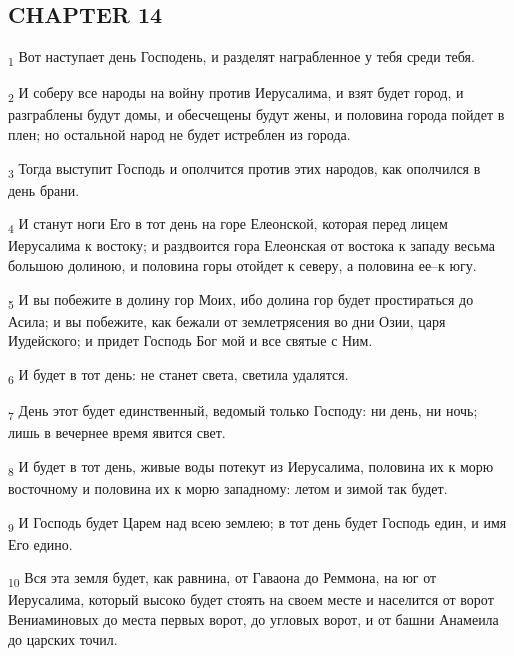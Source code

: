 \subsection{CHAPTER 14}
\begin{tcolorbox}
\textsubscript{1} Вот наступает день Господень, и разделят награбленное у тебя среди тебя.
\end{tcolorbox}
\begin{tcolorbox}
\textsubscript{2} И соберу все народы на войну против Иерусалима, и взят будет город, и разграблены будут домы, и обесчещены будут жены, и половина города пойдет в плен; но остальной народ не будет истреблен из города.
\end{tcolorbox}
\begin{tcolorbox}
\textsubscript{3} Тогда выступит Господь и ополчится против этих народов, как ополчился в день брани.
\end{tcolorbox}
\begin{tcolorbox}
\textsubscript{4} И станут ноги Его в тот день на горе Елеонской, которая перед лицем Иерусалима к востоку; и раздвоится гора Елеонская от востока к западу весьма большою долиною, и половина горы отойдет к северу, а половина ее--к югу.
\end{tcolorbox}
\begin{tcolorbox}
\textsubscript{5} И вы побежите в долину гор Моих, ибо долина гор будет простираться до Асила; и вы побежите, как бежали от землетрясения во дни Озии, царя Иудейского; и придет Господь Бог мой и все святые с Ним.
\end{tcolorbox}
\begin{tcolorbox}
\textsubscript{6} И будет в тот день: не станет света, светила удалятся.
\end{tcolorbox}
\begin{tcolorbox}
\textsubscript{7} День этот будет единственный, ведомый только Господу: ни день, ни ночь; лишь в вечернее время явится свет.
\end{tcolorbox}
\begin{tcolorbox}
\textsubscript{8} И будет в тот день, живые воды потекут из Иерусалима, половина их к морю восточному и половина их к морю западному: летом и зимой так будет.
\end{tcolorbox}
\begin{tcolorbox}
\textsubscript{9} И Господь будет Царем над всею землею; в тот день будет Господь един, и имя Его едино.
\end{tcolorbox}
\begin{tcolorbox}
\textsubscript{10} Вся эта земля будет, как равнина, от Гаваона до Реммона, на юг от Иерусалима, который высоко будет стоять на своем месте и населится от ворот Вениаминовых до места первых ворот, до угловых ворот, и от башни Анамеила до царских точил.
\end{tcolorbox}
